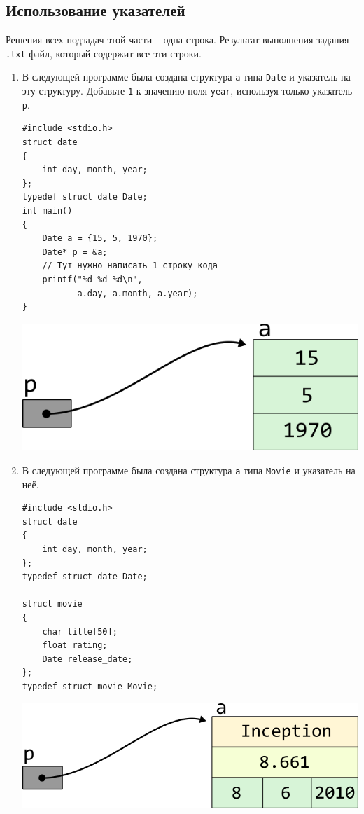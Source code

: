 \documentclass{article}
\begin{document}
\subsection{Использование указателей}
Решения всех подзадач этой части -- одна строка. Результат выполнения задания -- \texttt{.txt} файл, который содержит все эти строки.
\begin{enumerate}
\item В следующей программе была создана структура \texttt{a} типа \texttt{Date} и указатель на эту структуру. Добавьте \texttt{1} к значению поля \texttt{year}, используя только указатель \texttt{p}.
\begin{multicols}{2}
\begin{lstlisting}
#include <stdio.h>
struct date 
{
    int day, month, year;
};
typedef struct date Date;
int main() 
{
    Date a = {15, 5, 1970};
    Date* p = &a;
    // Тут нужно написать 1 строку кода
    printf("%d %d %d\n", 
           a.day, a.month, a.year);
}
\end{lstlisting}

\vfill \null    
\columnbreak
\vfill \null 

\includegraphics[scale=1]{../images/pointer_schemes/pointer_to_struct_date.png}
\end{multicols}

\item В следующей программе была создана структура \texttt{a} типа \texttt{Movie} и указатель на неё.
\begin{multicols}{2}
\begin{lstlisting}
#include <stdio.h>
struct date 
{
    int day, month, year;
};
typedef struct date Date;

struct movie 
{
    char title[50];
    float rating;
    Date release_date;
};
typedef struct movie Movie;
\end{lstlisting}

\vfill \null  
\columnbreak
\vfill \null  

\begin{center}
\includegraphics[scale=1]{../images/pointer_schemes/pointer_to_struct_movie.png}
\end{center}
\end{multicols}


\end{enumerate}
\end{document}
